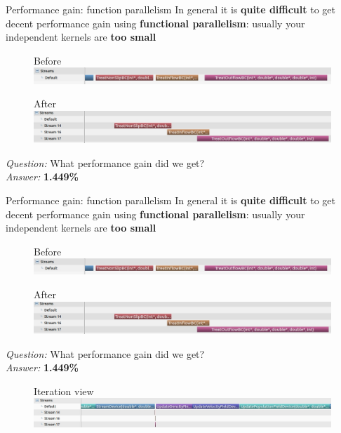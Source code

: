 \documentclass[9pt]{beamer}
\begin{document}
\begin{frame}[t]{Performance gain: function parallelism}
In general it is \textbf{quite difficult} to get decent performance gain using \textbf{functional parallelism}: usually your independent kernels are \textbf{too small}
\begin{figure}
	Before\\
	\includegraphics[scale=0.25]{images/streams-1.jpg}
	\centering
\end{figure}

\begin{figure}
	After\\
	\includegraphics[scale=0.25]{images/streams-2.jpg}
	\centering
\end{figure}

\textit{Question:} What performance gain did we get?\\
\textit{Answer:} \textbf{1.449\%}

\end{frame}

\begin{frame}[t]{Performance gain: function parallelism}
In general it is \textbf{quite difficult} to get decent performance gain using \textbf{functional parallelism}: usually your independent kernels are \textbf{too small}
\begin{figure}
	Before\\
	\includegraphics[scale=0.25]{images/streams-1.jpg}
	\centering
\end{figure}

\begin{figure}
	After\\
	\includegraphics[scale=0.25]{images/streams-2.jpg}
	\centering
\end{figure}

\textit{Question:} What performance gain did we get?\\
\textit{Answer:} \textbf{1.449\%}

\begin{figure}
	Iteration view
	\includegraphics[scale=0.25]{images/streams-3.jpg}
	\centering
\end{figure}
\end{frame}
\end{document}

